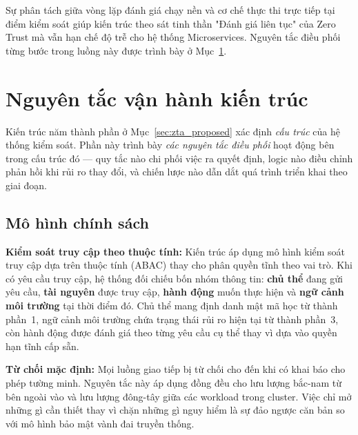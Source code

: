 Sự phân tách giữa vòng lặp đánh giá chạy nền và cơ chế thực thi trực tiếp tại điểm kiểm soát giúp kiến trúc theo sát tinh thần "Đánh giá liên tục" của Zero Trust mà vẫn hạn chế độ trễ cho hệ thống Microservices. Nguyên tắc điều phối từng bước trong luồng này được trình bày ở Mục~\ref{sec:operating_principles}.

\section{Nguyên tắc vận hành kiến trúc}
\label{sec:operating_principles}

Kiến trúc năm thành phần ở Mục~\ref{sec:zta_proposed} xác định \textit{cấu trúc} của hệ thống kiểm soát. Phần này trình bày \textit{các nguyên tắc điều phối} hoạt động bên trong cấu trúc đó --- quy tắc nào chi phối việc ra quyết định, logic nào điều chỉnh phản hồi khi rủi ro thay đổi, và chiến lược nào dẫn dắt quá trình triển khai theo giai đoạn.

\subsection{Mô hình chính sách}
\label{subsec:policy_model}

\textbf{Kiểm soát truy cập theo thuộc tính:} Kiến trúc áp dụng mô hình kiểm soát truy cập dựa trên thuộc tính (ABAC) \parencite{nist_abac} thay cho phân quyền tĩnh theo vai trò. Khi có yêu cầu truy cập, hệ thống đối chiếu bốn nhóm thông tin: \textbf{chủ thể} đang gửi yêu cầu, \textbf{tài nguyên} được truy cập, \textbf{hành động} muốn thực hiện và \textbf{ngữ cảnh môi trường} tại thời điểm đó. Chủ thể mang định danh mật mã học từ thành phần~1, ngữ cảnh môi trường chứa trạng thái rủi ro hiện tại từ thành phần~3, còn hành động được đánh giá theo từng yêu cầu cụ thể thay vì dựa vào quyền hạn tĩnh cấp sẵn.

\textbf{Từ chối mặc định:} Mọi luồng giao tiếp bị từ chối cho đến khi có khai báo cho phép tường minh. Nguyên tắc này áp dụng đồng đều cho lưu lượng bắc-nam từ bên ngoài vào và lưu lượng đông-tây giữa các workload trong cluster. Việc chỉ mở những gì cần thiết thay vì chặn những gì nguy hiểm là sự đảo ngược căn bản so với mô hình bảo mật vành đai truyền thống.

